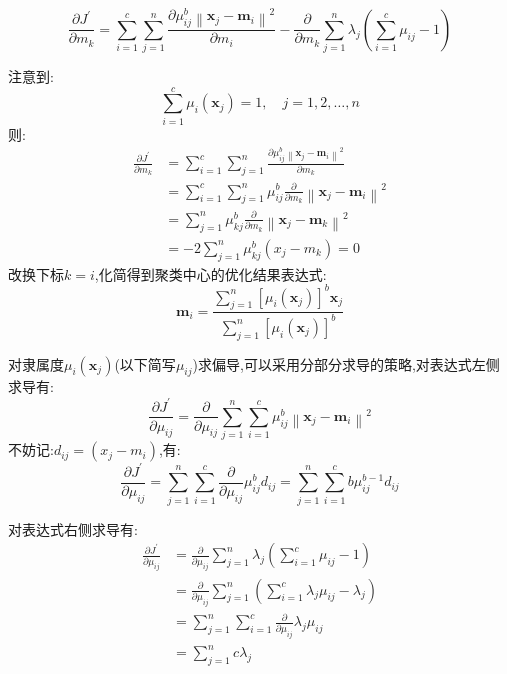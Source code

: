 \documentclass[homework]{IEEEtran}
\begin{document}
\begin{CJK}{UTF8}{gkai}
$$
\frac{\partial J^{\prime}}{\partial m_{k}}=\sum_{i=1}^{c} \sum_{j=1}^{n} \frac{\partial \mu_{i j}^{b}\left\|\mathbf{x}_{j}-\mathbf{m}_{i}\right\|^{2}}
{\partial m_{i}}-\frac{\partial}{\partial m_{k}} \sum_{j=1}^{n} \lambda_{j}\left(\sum_{i=1}^{c} \mu_{i j}-1\right)
$$ \par
注意到:
$$
\sum\limits_{i=1}^{c} \mu_{i}\left(\mathbf{x}_{j}\right)=1, \quad j=1,2, \ldots, n
$$
则:
\begin{align*}
    \frac{\partial J^{\prime}}{\partial m_{k}} &= \sum_{i = 1}^{c} \sum_{j = 1}^{n} \frac{\partial \mu_{i j}^{b}\left\|\mathbf{x}_{j}-\mathbf{m}_{i}\right\|^{2}}{\partial m_{k}} \\ 
    &= \sum_{i = 1}^{c} \sum_{j = 1}^{n} \mu_{i j}^{b} \frac{\partial}{\partial m_{k}}\left\|\mathbf{x}_{j}-\mathbf{m}_{i}\right\|^{2} \\ 
    &= \sum_{j = 1}^{n} \mu_{k j}^{b} \frac{\partial}{\partial m_{k}}\left\|\mathbf{x}_{j}-\mathbf{m}_{k}\right\|^{2} \\ 
    &= -2 \sum_{j = 1}^{n} \mu_{k j}^{b}\left(x_{j}-m_{k}\right) = 0 
\end{align*}
改换下标$k=i$,化简得到聚类中心的优化结果表达式:
$$
\mathbf{m}_{i}=\frac{\sum\limits_{j=1}^{n}\left[\mu_{i}\left(\mathbf{x}_{j}\right)\right]^{b} \mathbf{x}_{j}}{\sum\limits_{j=1}^{n}\left[\mu_{i}\left(\mathbf{x}_{j}\right)\right]^{b}}
$$ \par
对隶属度$\mu_{i}\left(\mathbf{x}_{j}\right)$(以下简写$\mu_{ij}$)求偏导,可以采用分部分求导的策略,对表达式左侧求导有:
$$
\frac{\partial J^{\prime}}{\partial \mu_{i j}}=\frac{\partial}{\partial \mu_{i j}} \sum_{j=1}^{n} \sum_{i=1}^{c} \mu_{i j}^{b}\left\|\mathbf{x}_{j}-\mathbf{m}_{i}\right\|^{2}
$$
不妨记:$d_{ij}=\left(x_j - m_i\right)$,有:
$$
\frac{\partial J^{\prime}}{\partial \mu_{i j}}=\sum_{j=1}^{n} \sum_{i=1}^{c} \frac{\partial}{\partial \mu_{i j}} \mu_{i j}^{b} d_{i j}=\sum_{j=1}^{n} \sum_{i=1}^{c} b \mu_{i j}^{b-1} d_{i j}
$$ \par
对表达式右侧求导有:
\begin{align*}
    \frac{\partial J^{\prime}}{\partial \mu_{i j}} &=\frac{\partial}{\partial \mu_{i j}} \sum_{j=1}^{n} \lambda_{j}\left(\sum_{i=1}^{c} \mu_{i j}-1\right) \\
     &=\frac{\partial}{\partial \mu_{i j}} \sum_{j=1}^{n}\left(\sum_{i=1}^{c} \lambda_{j} \mu_{i j}-\lambda_{j}\right) \\
     &=\sum_{j=1}^{n} \sum_{i=1}^{c} \frac{\partial}{\partial \mu_{i j}} \lambda_{j} \mu_{i j} \\
     &=\sum_{j=1}^{n} c \lambda_{j}

\end{align*}
\end{CJK}
\end{document}
